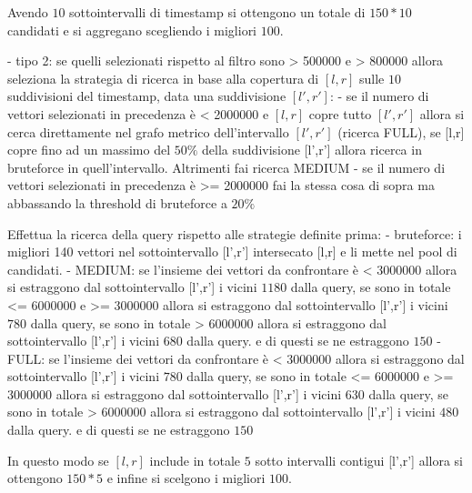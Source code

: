  Avendo $10$ sottointervalli di timestamp si ottengono un totale di $150*10$ candidati 
 e si aggregano scegliendo i migliori $100$.
 
- tipo 2: se quelli selezionati rispetto al filtro sono > 500000 e > 800000 allora 
 seleziona la strategia di ricerca in base alla copertura di $[l,r]$ sulle $10$ 
 suddivisioni del timestamp, data una suddivisione $[l',r']$:
    - se il numero di vettori selezionati in precedenza è < 2000000 e $[l,r]$ copre 
    tutto $[l',r']$ allora si cerca direttamente nel grafo metrico dell'intervallo $[l',r']$ (ricerca FULL),
    se [l,r] copre fino ad un massimo del $50\%$ della suddivisione [l',r'] allora 
    ricerca in bruteforce in quell'intervallo. Altrimenti fai ricerca MEDIUM
    - se il numero di vettori selezionati in precedenza è >= 2000000 fai la stessa 
    cosa di sopra ma abbassando la threshold di bruteforce a  $20\%$

  Effettua la ricerca della query rispetto alle strategie definite prima:
    - bruteforce: i migliori 140 vettori nel sottointervallo [l',r'] intersecato [l,r]
    e li mette nel pool di candidati.
    - MEDIUM: se l'insieme dei vettori da confrontare è < 3000000 allora si estraggono 
    dal sottointervallo [l',r'] i vicini $1180$ dalla query, se sono in totale <= 6000000 e >=  3000000
    allora si estraggono dal sottointervallo [l',r'] i vicini $780$ dalla query, 
    se sono in totale > 6000000 allora si estraggono dal sottointervallo [l',r'] i vicini $680$ dalla query.
    e di questi se ne estraggono $150$
    - FULL: se l'insieme dei vettori da confrontare è < 3000000 allora si estraggono 
    dal sottointervallo [l',r'] i vicini $780$ dalla query, se sono in totale <= 6000000 e >=  3000000
    allora si estraggono dal sottointervallo [l',r'] i vicini $630$ dalla query, 
    se sono in totale > 6000000 allora si estraggono dal sottointervallo [l',r'] i vicini $480$ dalla query.
    e di questi se ne estraggono $150$
  
  In questo modo se $[l,r]$ include in totale $5$ sotto intervalli contigui [l',r']
  allora si ottengono $150*5$ e infine si scelgono i migliori $100$.